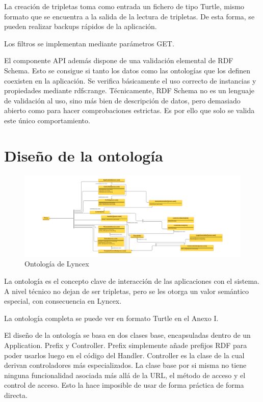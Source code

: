 \documentclass[12pt]{report} %
\begin{document}
La creación de tripletas toma como entrada un fichero de tipo Turtle, mismo formato que se encuentra a la salida de la lectura de tripletas.
De esta forma, se pueden realizar backups rápidos de la aplicación.

Los filtros se implementan mediante parámetros GET.

El componente API además dispone de una validación elemental de RDF Schema.
Esto se consigue si tanto los datos como las ontologías que los definen coexisten en la aplicación.
Se verifica básicamente el uso correcto de instancias y propiedades mediante rdfs:range.
Técnicamente, RDF Schema no es un lenguaje de validación al uso, sino más bien de descripción de datos, pero demasiado abierto como para hacer comprobaciones estrictas.
Es por ello que solo se valida este único comportamiento.

\section{Diseño de la ontología}

\begin{figure}
    \centering
    \includegraphics[width=\textwidth]{lyncex.png}
    \caption{Ontología de Lyncex}
    \label{fig:ontologia}
\end{figure}

La ontología es el concepto clave de interacción de las aplicaciones con el sistema. A nivel técnico no dejan de ser tripletas, pero se les otorga un valor semántico especial, con consecuencia en Lyncex.

La ontología completa se puede ver en formato Turtle en el Anexo I.

El diseño de la ontología se basa en dos clases base, encapsuladas dentro de un Application. Prefix y Controller. Prefix simplemente añade prefijos RDF para poder usarlos luego en el código del Handler. Controller es la clase de la cual derivan controladores más especializados. La clase base por si misma no tiene ninguna funcionalidad asociada más allá de la URL, el método de acceso y el control de acceso. Esto la hace imposible de usar de forma práctica de forma directa.
\end{document}
